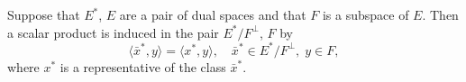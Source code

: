 Suppose that $E^*$, $E$ are a pair of dual spaces and that $F$ is a subspace of $E$. Then a scalar product is induced in the pair $E^* / F^\perp$, $F$ by
$$\langle \bar{x}^*, y \rangle = \langle x^*, y \rangle, \quad \bar{x}^* \in E^* / F^\perp, \; y \in F,$$
where $x^*$ is a representative of the class $\bar{x}^*$.
